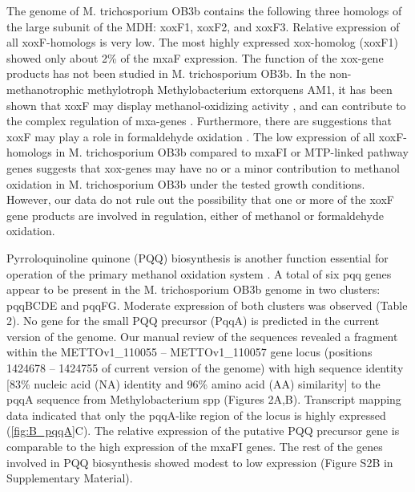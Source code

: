 The genome of M. trichosporium OB3b contains the following three homologs of the large subunit of the MDH: xoxF1, xoxF2, and xoxF3.
Relative expression of all xoxF-homologs is very low.
The most highly expressed xox-homolog (xoxF1) showed only about 2\% of the mxaF expression.
The function of the xox-gene products has not been studied in M. trichosporium OB3b.
In the non-methanotrophic methylotroph Methylobacterium extorquens AM1, it has been shown that xoxF may display methanol-oxidizing activity \cite{schmidt2010}, and can contribute to the complex regulation of mxa-genes \cite{skovran2011}.
Furthermore, there are suggestions that xoxF may play a role in formaldehyde oxidation \cite{wilson2008}.
The low expression of all xoxF-homologs in M. trichosporium OB3b compared to mxaFI or MTP-linked pathway genes suggests that xox-genes may have no or a minor contribution to methanol oxidation in M. trichosporium OB3b under the tested growth conditions.
However, our data do not rule out the possibility that one or more of the xoxF gene products are involved in regulation, either of methanol or formaldehyde oxidation.

Pyrroloquinoline quinone (PQQ) biosynthesis is another function essential for operation of the primary methanol oxidation system \cite{toyama1997, anthony2002}.
A total of six pqq genes appear to be present in the M. trichosporium OB3b genome in two clusters: pqqBCDE and pqqFG.
Moderate expression of both clusters was observed (Table 2).
No gene for the small PQQ precursor (PqqA) is predicted in the current version of the genome.
Our manual review of the sequences revealed a fragment within the METTOv1\_110055 – METTOv1\_110057 gene locus (positions 1424678 – 1424755 of current version of the genome) with high sequence identity [83\% nucleic acid (NA) identity and 96\% amino acid (AA) similarity] to the pqqA sequence from Methylobacterium spp (Figures 2A,B).
Transcript mapping data indicated that only the pqqA-like region of the locus is highly expressed (\ref{fig:B_pqqA}C).
The relative expression of the putative PQQ precursor gene is comparable to the high expression of the mxaFI genes.
The rest of the genes involved in PQQ biosynthesis showed modest to low expression (Figure S2B in Supplementary Material).


